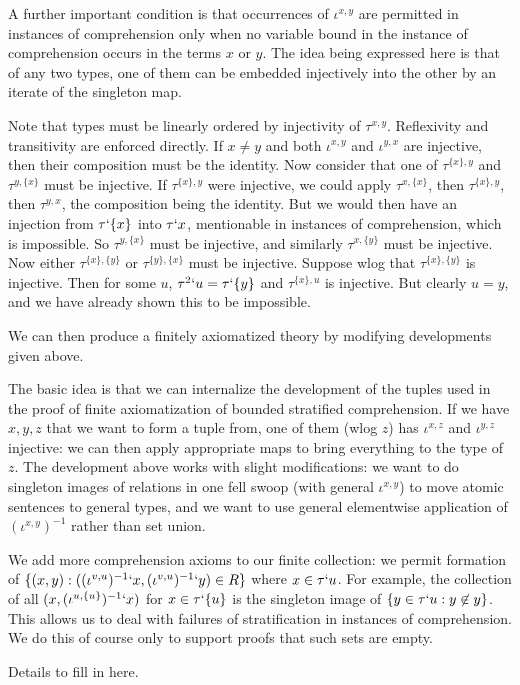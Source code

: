 \documentclass[12pt]{article}
\begin{document}
A further important condition is that occurrences of $\iota^{x,y}$ are permitted in instances of comprehension only when no variable bound in the instance of comprehension occurs in the terms $x$ or $y$.  The idea being expressed here is that of any two types, one of them can be embedded injectively into the other by an iterate of the singleton map.

Note that types must be linearly ordered by injectivity of $\tau^{x,y}$.  Reflexivity and transitivity are enforced directly.  If $x \neq y$ and both $\iota^{x,y}$ and $\iota^{y,x}$ are injective,
then their composition must be the identity.  Now consider that one of $\tau^{\{x\},y}$ and $\tau^{y,\{x\}}$ must be injective.  If  $\tau^{\{x\},y}$ were injective,
we could apply $\tau^{x,\{x\}}$, then $\tau^{\{x\},y}$, then $\tau^{y,x}$, the composition being the identity.  But we would then have an injection from $\tau`{\{x\}}$ into $\tau`x$, mentionable in instances of comprehension, which is impossible.  So $\tau^{y,\{x\}}$ must be injective, and similarly $\tau^{x,\{y\}}$ must be injective.  Now either $\tau^{\{x\},\{y\}}$
or $\tau^{\{y\},\{x\}}$ must be injective.  Suppose wlog that $\tau^{\{x\},\{y\}}$ is injective.  Then for some $u$, $\tau^2`u = \tau`\{y\}$ and $\tau^{\{x\},u}$ is injective.
But clearly $u=y$, and we have already shown this to be impossible.

We can then produce a finitely axiomatized theory by modifying developments given above.

The basic idea is that we can internalize the development of the tuples used in the proof of finite axiomatization of bounded stratified comprehension.  If we have $x,y,z$ that
we want to form a tuple from, one of them (wlog $z$) has $\iota^{x,z}$ and $\iota^{y,z}$ injective:  we can then apply appropriate maps to bring everything to the type of $z$.
The development above works with slight modifications:  we want to do singleton images of relations in one fell swoop (with general $\iota^{x,y}$) to move atomic sentences to general types, and we want to use
general elementwise application of $(\iota^{x,y})^{-1}$ rather than set union.

We add more comprehension axioms to our finite collection:  we permit formation of $\{(x,y):((\iota^{v,u})^{-1}`x,(\iota^{v,u})^{-1}`y) \in R\}$ where $x \in \tau`u$.  For example,
the collection of all $(x,(\iota^{u,\{u\}})^{-1}`x)$ for $x \in \tau`\{u\}$ is the singleton image of $\{y \in \tau`u:y \not\in y\}$.  This allows us to deal with failures of stratification in instances of comprehension.  We do this of course only to support proofs that such sets are empty.

Details to fill in here.
\end{document}
